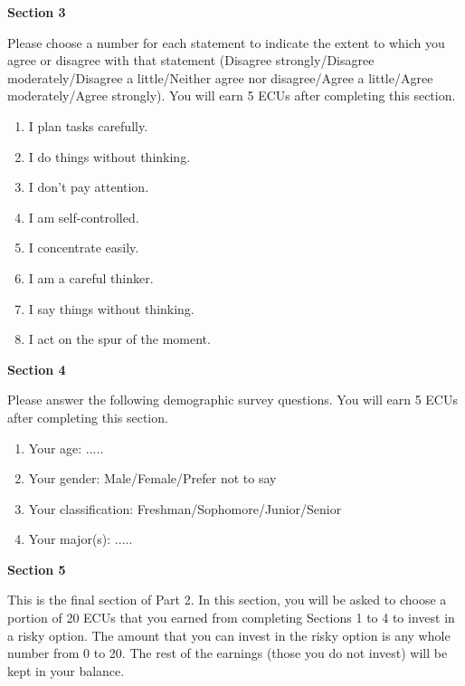 \documentclass[thesis]{uathesis}
\begin{document}
\begin{body}
\begin{appendices}
\noindent\textbf{Section 3}

\medskip

Please choose a number for each statement to indicate the extent to which you agree or disagree with that statement (Disagree strongly/Disagree moderately/Disagree a little/Neither agree nor disagree/Agree a little/Agree moderately/Agree strongly). You will earn 5 ECUs after completing this section.


\begin{enumerate}
  \item  I plan tasks carefully.
  \item I do things without thinking.
  \item I don't pay attention.
  \item I am self-controlled.
  \item I concentrate easily.
  \item I am a careful thinker.
  \item I say things without thinking.
  \item I act on the spur of the moment.
\end{enumerate}



\noindent\textbf{Section 4}

\medskip

Please answer the following demographic survey questions. You will earn 5 ECUs after completing this section.


\begin{enumerate}
  \item Your age: .....
  \item Your gender: Male/Female/Prefer not to say
  \item Your classification: Freshman/Sophomore/Junior/Senior
  \item Your major(s): .....
\end{enumerate}



\noindent\textbf{Section 5}

\medskip

This is the final section of Part 2. In this section, you will be asked to choose a portion of 20 ECUs that you earned from completing Sections 1 to 4 to invest in a risky option.  The amount that you can invest in the risky option is any whole number from 0 to 20. The rest of the earnings (those you do not invest) will be kept in your balance.


\begin{itemize}


\end{itemize}
\end{appendices}
\end{body}
\end{document}
